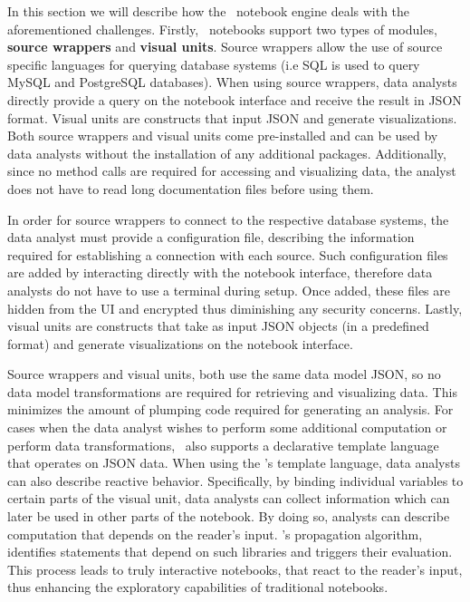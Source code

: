 In this section we will describe how the \projname\ notebook engine deals with the aforementioned challenges. Firstly, \projname\ notebooks support two types of modules, \textbf{source wrappers} and \textbf{visual units}. Source wrappers allow the use of source specific languages for querying database systems (i.e SQL is used to query MySQL and PostgreSQL databases). When using source wrappers, data analysts directly provide a query on the notebook interface and receive the result in JSON format. Visual units are constructs that input JSON and generate visualizations. Both source wrappers and visual units come pre-installed and can be used by data analysts without the installation of any additional packages. Additionally, since no method calls are required for accessing and visualizing data, the analyst does not have to read long documentation files before using them. 

In order for source wrappers to connect to the respective database systems, the data analyst must provide a configuration file, describing the information required for establishing a connection with each source. Such configuration files are added by interacting directly with the notebook interface, therefore data analysts do not have to use a terminal during setup. Once added, these files are hidden from the UI and encrypted thus diminishing any security concerns. Lastly, visual units are constructs that take as input JSON objects (in a predefined format) and generate visualizations on the notebook interface. 


Source wrappers and visual units, both use the same data model JSON, so no data model transformations are required for retrieving and visualizing data. This minimizes the amount of plumping code required for generating an analysis. For cases when the data analyst wishes to perform some additional computation or perform data transformations, \projname\ also supports a declarative template language that operates on JSON data. When using the \projname's template language, data analysts can also describe reactive behavior. Specifically, by binding individual variables to certain parts of the visual unit, data analysts can collect information which can later be used in other parts of the notebook. By doing so, analysts can describe computation that depends on the reader's input. \projname's propagation algorithm, identifies statements that depend on such libraries and triggers their evaluation. This process leads to truly interactive notebooks, that react to the reader's input, thus enhancing the exploratory capabilities of traditional notebooks.

